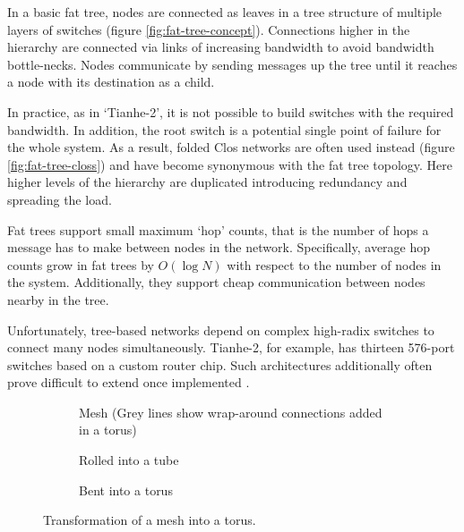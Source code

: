 				\label{sec:fat-tree}
				
				In a basic fat tree, nodes are connected as leaves in a tree structure
				of multiple layers of switches (figure \ref{fig:fat-tree-concept}).
				Connections higher in the hierarchy are connected via links of
				increasing bandwidth to avoid bandwidth bottle-necks.  Nodes communicate
				by sending messages up the tree until it reaches a node with its
				destination as a child.
				
				In practice, as in `Tianhe-2', it is not possible to build switches with
				the required bandwidth. In addition, the root switch is a potential
				single point of failure for the whole system. As a result, folded Clos
				networks are often used instead (figure \ref{fig:fat-tree-closs}) and
				have become synonymous with the fat tree topology. Here higher levels of
				the hierarchy are duplicated introducing redundancy and spreading the
				load.
				
				Fat trees support small maximum `hop' counts, that is the number of hops
				a message has to make between nodes in the network. Specifically,
				average hop counts grow in fat trees by $O(\log{N})$ with respect to the
				number of nodes in the system. Additionally, they support cheap
				communication between nodes nearby in the tree.
				
				Unfortunately, tree-based networks depend on complex high-radix switches
				to connect many nodes simultaneously.  Tianhe-2, for example, has
				thirteen 576-port switches based on a custom router chip. Such
				architectures additionally often prove difficult to extend once
				implemented \cite{dally04}.
				
				\begin{figure}
					\begin{subfigure}[t]{\textwidth}
						\center
						
						\caption{Mesh (Grey lines show wrap-around connections added in a
						torus)}
						\label{fig:torus-flat}
					\end{subfigure}
					
					\vspace{1em}
					
					\begin{subfigure}[t]{\textwidth}
						\center
						
						\caption{Rolled into a tube}
						\label{fig:torus-pipe}
					\end{subfigure}
					
					\vspace{1em}
					
					\begin{subfigure}[t]{\textwidth}
						\center
						
						\caption{Bent into a torus}
						\label{fig:torus-3D}
					\end{subfigure}
					
					\caption{Transformation of a mesh into a torus.}
					\label{fig:forming-a-torus}
				\end{figure}
			
